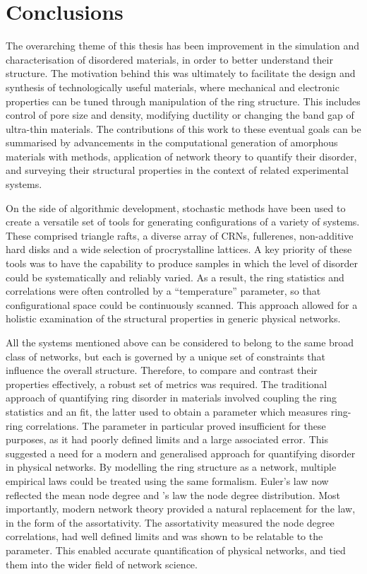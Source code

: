 \chapter[\,Conclusions]{Conclusions}
\label{ch:conclusions}

The overarching theme of this thesis has been improvement in the simulation and characterisation of \td{} disordered materials, in order to better understand their structure.
The motivation behind this was ultimately to facilitate the design and synthesis of technologically useful materials, where mechanical and electronic properties can be tuned through manipulation of the ring structure.
This includes control of pore size and density, modifying ductility or changing the band gap of ultra\--thin materials.
The contributions of this work to these eventual goals can be summarised by advancements in the computational generation of amorphous materials with \mc{} methods, application of network theory to quantify their disorder, and surveying their structural properties in the context of related experimental systems.

On the side of algorithmic development, stochastic methods have been used to create a versatile set of tools for generating configurations of a variety of \td{} systems.
These comprised triangle rafts, a diverse array of CRNs, fullerenes, non\--additive hard disks and a wide selection of procrystalline lattices.
A key priority of these tools was to have the capability to produce samples in which the level of disorder could be systematically and reliably varied.
As a result, the ring statistics and correlations were often controlled by a ``temperature'' parameter, so that configurational space could be continuously scanned.
This approach allowed for a holistic examination of the structural properties in generic physical networks. 

All the systems mentioned above can be considered to belong to the same broad class of \td{} networks, but each is governed by a unique set of constraints that influence the overall structure.
Therefore, to compare and contrast their properties effectively, a robust set of metrics was required.
The traditional approach of quantifying ring disorder in \td{} materials involved coupling the ring statistics and an \aw{} fit, the latter used to obtain a parameter which measures ring\--ring correlations.
The \aw{} parameter in particular proved insufficient for these purposes, as it had poorly defined limits and a large associated error.
This suggested a need for a modern and generalised approach for quantifying disorder in physical \td{} networks.
By modelling the ring structure as a network, multiple empirical laws could be treated using the same formalism.
Euler's law now reflected the mean node degree and \lm's law the node degree distribution.
Most importantly, modern network theory provided a natural replacement for the \aw{} law, in the form of the assortativity.
The assortativity measured the node degree correlations, had well defined limits and was shown to be relatable to the \aw{} parameter.
This enabled accurate quantification of physical networks, and tied them into the wider field of network science.

